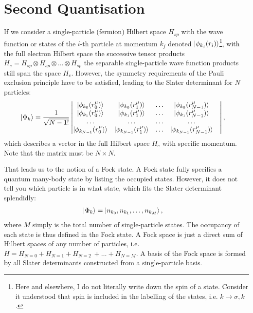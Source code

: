 \section{Second Quantisation}
\label{sec:secondquantisation}
If we consider a single-particle (fermion) Hilbert space $H_{sp}$ with the wave function or states of the $i$-th particle at momentum $k_j$ denoted $\ket{\phi_{k_j}(r_i)}$\footnote{Here and elsewhere, I do not literally write down the spin of a state. Consider it understood that spin is included in the labelling of the states, i.e. $k \rightarrow \sigma, k$.}, with the full electron Hilbert space the successive tensor products $H_{e} = H_{sp} \otimes H_{sp} \otimes \ldots \otimes H_{sp}$ the separable single-particle wave function products still span the space $H_e$. However, the symmetry requirements of the Pauli exclusion principle have to be satisfied, leading to the Slater determinant for $N$ particles\cite{yuli}:
\begin{align}
\ket{\Phi_k} &= \frac{1}{\sqrt{{N-1}!}} \begin{vmatrix}
\ket{\phi_{k_0}(r_0^\mu)} & \ket{\phi_{k_0}(r_1^\mu)} &\ldots& \ket{\phi_{k_0}(r_{N-1}^\mu)} \\
\ket{\phi_{k_1}(r_0^\mu)} & \ket{\phi_{k_1}(r_1^\mu)} &\ldots& \ket{\phi_{k_1}(r_{N-1}^\mu)} \\
\ldots&\ldots&\ldots&\ldots&\\
\ket{\phi_{k_{N-1}}(r_0^\mu)} & \ket{\phi_{k_{N-1}}(r_1^\mu)} &\ldots& \ket{\phi_{k_{N-1}}(r_{N-1}^\mu)} \\
\end{vmatrix},
\label{eq:slaterdeterminant}
\end{align}
which describes a vector in the full Hilbert space $H_e$ with specific momentum. Note that the matrix must be $N\times N$. %

That leads us to the notion of a Fock state. A Fock state fully specifies a quantum many-body state by listing the occupied states. However, it does not tell you which particle is in what state, which fits the Slater determinant splendidly:
\begin{align}
\ket{\Phi_k} &= \ket{n_{k_0}, n_{k_1},\ldots, n_{k_M}},
\label{eq:fock}
\end{align}
where $M$ simply is the total number of single-particle states. The occupancy of each state is thus defined in the Fock state. A Fock space is just a direct sum of Hilbert spaces of any number of particles, i.e. $H = H_{N=0} + H_{N=1} + H_{N=2}\ + \ldots + H_{N=M}$. A basis of the Fock space is formed by all Slater determinants constructed from a single-particle basis. 


